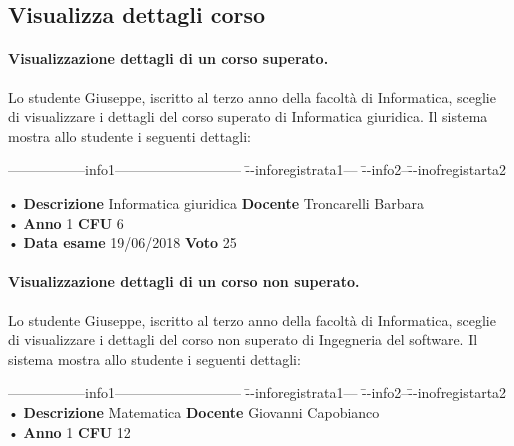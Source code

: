 \subsection{Visualizza dettagli corso}
\paragraph{Visualizzazione dettagli di un corso superato.}
Lo studente Giuseppe, iscritto al terzo anno della facoltà di Informatica, sceglie di visualizzare i dettagli del corso superato di Informatica giuridica. Il sistema mostra allo studente i seguenti dettagli:

 \begin{tabbing}
	\hspace{1cm}-----------------info1--------------------------- \= --inforegistrata1--- \= --info2--\=--inofregistarta2 \kill

	\hspace{1cm} • \textbf{Descrizione} Informatica giuridica \> \textbf{Docente} Troncarelli Barbara\\
	\hspace{1cm} • \textbf{Anno} 1 \> \textbf{CFU} 6   \\
	\hspace{1cm} • \textbf{Data esame} 19/06/2018 \> \textbf{Voto} 25 \\
\end{tabbing}

\paragraph{Visualizzazione dettagli di un corso non superato.}
Lo studente Giuseppe, iscritto al terzo anno della facoltà di Informatica, sceglie di visualizzare i dettagli del corso non superato di Ingegneria del software. Il sistema mostra allo studente i seguenti dettagli:

 \begin{tabbing}
	\hspace{1cm}-----------------info1--------------------------- \= --inforegistrata1--- \= --info2--\=--inofregistarta2 \kill
	\hspace{1cm} • \textbf{Descrizione} Matematica \> \textbf{Docente} Giovanni  Capobianco\\
	\hspace{1cm} • \textbf{Anno} 1 \> \textbf{CFU} 12  \\
\end{tabbing}

